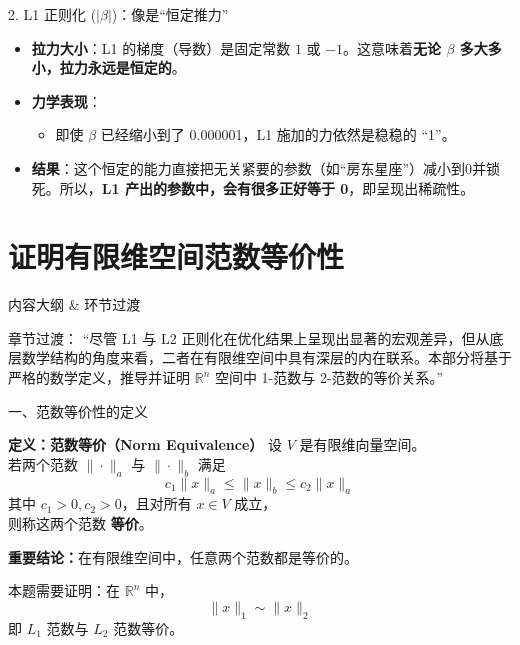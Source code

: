 \documentclass[aspectratio=169]{beamer}
\begin{document}
\begin{frame}{2. L1 正则化 ($|\beta|$)：像是“恒定推力”}
    \begin{itemize}
        \item \textbf{拉力大小}：L1 的梯度（导数）是固定常数 $1$ 或 $-1$。这意味着\textbf{无论 $\beta$ 多大多小，拉力永远是恒定的}。
        \item \textbf{力学表现}：
        \begin{itemize}
            \item 即使 $\beta$ 已经缩小到了 0.000001，L1 施加的力依然是稳稳的 “1”。
        \end{itemize}
        \item \textbf{结果}：这个恒定的能力直接把无关紧要的参数（如“房东星座”）减小到0并锁死。所以，\textbf{L1 产出的参数中，会有很多正好等于 0}，即呈现出稀疏性。
    \end{itemize}
\end{frame}


\section{证明有限维空间范数等价性}

\begin{frame}{内容大纲 \& 环节过渡}
    \tableofcontents[currentsection]
    \vspace{0.5cm}
    \begin{block}{章节过渡：}
        “尽管 L1 与 L2 正则化在优化结果上呈现出显著的宏观差异，但从底层数学结构的角度来看，二者在有限维空间中具有深层的内在联系。本部分将基于严格的数学定义，推导并证明 $\mathbb{R}^n$ 空间中 1-范数与 2-范数的等价关系。”
    \end{block}
\end{frame}

\begin{frame}{一、范数等价性的定义}
    \begin{block}{\textbf{定义：范数等价（Norm Equivalence）}}
        设 $V$ 是有限维向量空间。\\
        若两个范数 $\|\cdot\|_a$ 与 $\|\cdot\|_b$ 满足
        $$ c_1\|x\|_a \le \|x\|_b \le c_2\|x\|_a $$
        其中 $c_1>0, c_2>0$，且对所有 $x\in V$ 成立，\\
        则称这两个范数 \textbf{等价}。
    \end{block}
    
    \textbf{重要结论：}在有限维空间中，任意两个范数都是等价的。
    
    \vspace{0.3cm}
    本题需要证明：在 $\mathbb{R}^n$ 中，
    $$ \|x\|_1 \sim \|x\|_2 $$
    即 $L_1$ 范数与 $L_2$ 范数等价。
\end{frame}
\end{document}

